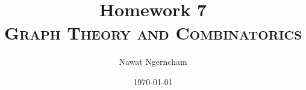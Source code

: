 \documentclass[answers]{exam}
\title{\Huge{Homework 7}
	\\
\Large\scshape{Graph Theory and Combinatorics}}
\author{Nawat Ngerncham}
\date{\today}
\begin{document}
\maketitle

\begin{questions}
  \setcounter{question}{3}
  
  
\end{questions}

% 
% 
\end{document}
